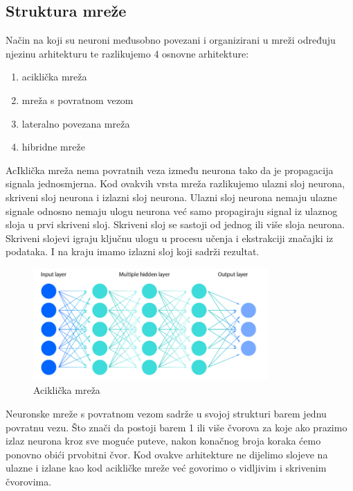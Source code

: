 \subsection{Struktura mreže}\label{subsec:struktura-mreze}
Način na koji su neuroni međusobno povezani i organizirani u mreži određuju njezinu arhitekturu te razlikujemo 4 osnovne arhitekture:

\begin{enumerate}
    \item aciklička mreža
    \item mreža s povratnom vezom
    \item lateralno povezana mreža
    \item hibridne mreže
\end{enumerate}

AcIklička mreža nema povratnih veza između neurona tako da je propagacija signala jednosmjerna.
Kod ovakvih vrsta mreža razlikujemo ulazni sloj neurona, skriveni sloj neurona i izlazni sloj neurona.
Ulazni sloj neurona nemaju ulazne signale odnosno nemaju ulogu neurona već samo propagiraju signal iz ulaznog sloja u prvi skriveni sloj.
Skriveni sloj se sastoji od jednog ili više sloja neurona.
Skriveni slojevi igraju ključnu ulogu u procesu učenja i ekstrakciji značajki iz podataka.
I na kraju imamo izlazni sloj koji sadrži rezultat.
\FloatBarrier
\begin{figure}[h]
    \centering
    \includegraphics[width=0.8\textwidth]{images/nn-arch}
    \caption{Aciklička mreža
    \protect\footnotemark}
    \label{fig:slika4}
\end{figure}
\FloatBarrier


Neuronske mreže s povratnom vezom sadrže u svojoj strukturi barem jednu povratnu vezu.
Što znači da postoji barem 1 ili više čvorova za koje ako prazimo izlaz neurona kroz sve moguće puteve, nakon konačnog broja koraka ćemo ponovno obići prvobitni čvor.
Kod ovakve arhitekture ne dijelimo slojeve na ulazne i izlane kao kod acikličke mreže već govorimo o vidljivim i skrivenim čvorovima.

